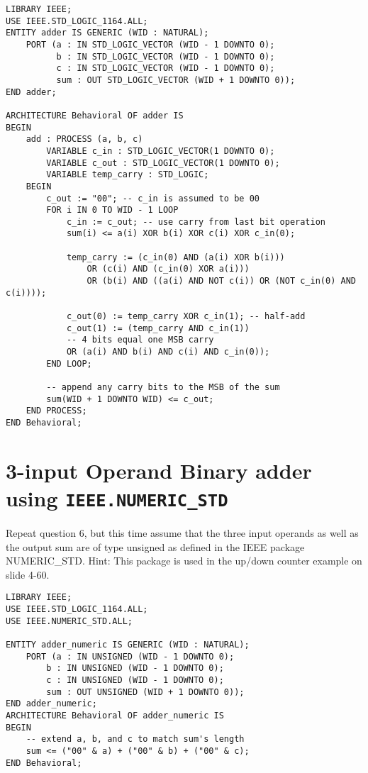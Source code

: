 \documentclass{article}
\begin{document}
\begin{verbatim}
LIBRARY IEEE;
USE IEEE.STD_LOGIC_1164.ALL;
ENTITY adder IS GENERIC (WID : NATURAL);
    PORT (a : IN STD_LOGIC_VECTOR (WID - 1 DOWNTO 0);
          b : IN STD_LOGIC_VECTOR (WID - 1 DOWNTO 0);
          c : IN STD_LOGIC_VECTOR (WID - 1 DOWNTO 0);
          sum : OUT STD_LOGIC_VECTOR (WID + 1 DOWNTO 0));
END adder;

ARCHITECTURE Behavioral OF adder IS
BEGIN
    add : PROCESS (a, b, c)
        VARIABLE c_in : STD_LOGIC_VECTOR(1 DOWNTO 0);
        VARIABLE c_out : STD_LOGIC_VECTOR(1 DOWNTO 0);
        VARIABLE temp_carry : STD_LOGIC;
    BEGIN
        c_out := "00"; -- c_in is assumed to be 00
        FOR i IN 0 TO WID - 1 LOOP
            c_in := c_out; -- use carry from last bit operation
            sum(i) <= a(i) XOR b(i) XOR c(i) XOR c_in(0);

            temp_carry := (c_in(0) AND (a(i) XOR b(i)))
                OR (c(i) AND (c_in(0) XOR a(i)))
                OR (b(i) AND ((a(i) AND NOT c(i)) OR (NOT c_in(0) AND c(i))));

            c_out(0) := temp_carry XOR c_in(1); -- half-add
            c_out(1) := (temp_carry AND c_in(1))
            -- 4 bits equal one MSB carry
            OR (a(i) AND b(i) AND c(i) AND c_in(0));
        END LOOP;

        -- append any carry bits to the MSB of the sum
        sum(WID + 1 DOWNTO WID) <= c_out;
    END PROCESS;
END Behavioral;
\end{verbatim}

\section{3-input Operand Binary adder using \texttt{IEEE.NUMERIC\_STD}}

\begin{displayquote}
Repeat question 6, but this time assume that the three input operands as well as the output sum are of type unsigned as defined in the IEEE package NUMERIC\_STD. Hint: This package is used in the up/down counter example on slide 4-60.
\end{displayquote}

\begin{verbatim}
LIBRARY IEEE;
USE IEEE.STD_LOGIC_1164.ALL;
USE IEEE.NUMERIC_STD.ALL;

ENTITY adder_numeric IS GENERIC (WID : NATURAL);
    PORT (a : IN UNSIGNED (WID - 1 DOWNTO 0);
        b : IN UNSIGNED (WID - 1 DOWNTO 0);
        c : IN UNSIGNED (WID - 1 DOWNTO 0);
        sum : OUT UNSIGNED (WID + 1 DOWNTO 0));
END adder_numeric;
ARCHITECTURE Behavioral OF adder_numeric IS
BEGIN
    -- extend a, b, and c to match sum's length
    sum <= ("00" & a) + ("00" & b) + ("00" & c);
END Behavioral;
\end{verbatim}
\end{document}
